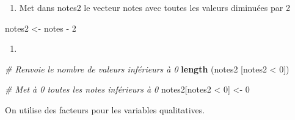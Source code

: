 \documentclass[
]{article}
\newenvironment{Shaded}{}{}
\newcommand{\CommentTok}[1]{\textcolor[rgb]{0.38,0.63,0.69}{\textit{#1}}}
\newcommand{\DecValTok}[1]{\textcolor[rgb]{0.25,0.63,0.44}{#1}}
\newcommand{\KeywordTok}[1]{\textcolor[rgb]{0.00,0.44,0.13}{\textbf{#1}}}
\newcommand{\NormalTok}[1]{#1}
\newcommand{\OperatorTok}[1]{\textcolor[rgb]{0.40,0.40,0.40}{#1}}
\newcommand{\StringTok}[1]{\textcolor[rgb]{0.25,0.44,0.63}{#1}}
\providecommand{\tightlist}{%
  \setlength{\itemsep}{0pt}\setlength{\parskip}{0pt}}
\begin{document}
\begin{enumerate}
\def\labelenumi{\arabic{enumi}.}
\setcounter{enumi}{7}
\tightlist
\item
  Met dans notes2 le vecteur notes avec toutes les valeurs diminuées par
  2
\end{enumerate}

\begin{Shaded}
\begin{Highlighting}[]
\NormalTok{notes2 \textless{}{-}}\StringTok{ }\NormalTok{notes }\OperatorTok{{-}}\StringTok{ }\DecValTok{2} 
\end{Highlighting}
\end{Shaded}

\begin{enumerate}
\def\labelenumi{\arabic{enumi}.}
\setcounter{enumi}{8}
\tightlist
\item
\end{enumerate}

\begin{Shaded}
\begin{Highlighting}[]
\CommentTok{\# Renvoie le nombre de valeurs inférieurs à 0}
\KeywordTok{length}\NormalTok{ (notes2 [notes2 }\OperatorTok{\textless{}}\StringTok{ }\DecValTok{0}\NormalTok{])}

\CommentTok{\# Met à 0 toutes les notes inférieurs à 0}
\NormalTok{notes2[notes2 }\OperatorTok{\textless{}}\StringTok{ }\DecValTok{0}\NormalTok{] \textless{}{-}}\StringTok{ }\DecValTok{0}
\end{Highlighting}
\end{Shaded}

On utilise des facteurs pour les variables qualitatives.
\end{document}
